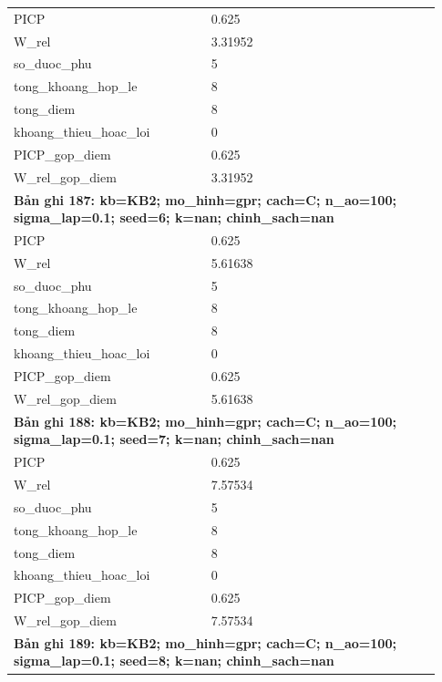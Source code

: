 \begin{longtable}{p{0.43\linewidth}p{0.50\linewidth}}
PICP & 0.625 \\
W\_\allowbreak rel & 3.31952 \\
so\_\allowbreak duoc\_\allowbreak phu & 5 \\
tong\_\allowbreak khoang\_\allowbreak hop\_\allowbreak le & 8 \\
tong\_\allowbreak diem & 8 \\
khoang\_\allowbreak thieu\_\allowbreak hoac\_\allowbreak loi & 0 \\
PICP\_\allowbreak gop\_\allowbreak diem & 0.625 \\
W\_\allowbreak rel\_\allowbreak gop\_\allowbreak diem & 3.31952 \\
\midrule
\multicolumn{2}{p{0.95\linewidth}}{\textbf{Bản ghi 187: kb=KB2; mo\_hinh=gpr; cach=C; n\_ao=100; sigma\_lap=0.1; seed=6; k=nan; chinh\_sach=nan}} \\
PICP & 0.625 \\
W\_\allowbreak rel & 5.61638 \\
so\_\allowbreak duoc\_\allowbreak phu & 5 \\
tong\_\allowbreak khoang\_\allowbreak hop\_\allowbreak le & 8 \\
tong\_\allowbreak diem & 8 \\
khoang\_\allowbreak thieu\_\allowbreak hoac\_\allowbreak loi & 0 \\
PICP\_\allowbreak gop\_\allowbreak diem & 0.625 \\
W\_\allowbreak rel\_\allowbreak gop\_\allowbreak diem & 5.61638 \\
\midrule
\multicolumn{2}{p{0.95\linewidth}}{\textbf{Bản ghi 188: kb=KB2; mo\_hinh=gpr; cach=C; n\_ao=100; sigma\_lap=0.1; seed=7; k=nan; chinh\_sach=nan}} \\
PICP & 0.625 \\
W\_\allowbreak rel & 7.57534 \\
so\_\allowbreak duoc\_\allowbreak phu & 5 \\
tong\_\allowbreak khoang\_\allowbreak hop\_\allowbreak le & 8 \\
tong\_\allowbreak diem & 8 \\
khoang\_\allowbreak thieu\_\allowbreak hoac\_\allowbreak loi & 0 \\
PICP\_\allowbreak gop\_\allowbreak diem & 0.625 \\
W\_\allowbreak rel\_\allowbreak gop\_\allowbreak diem & 7.57534 \\
\midrule
\multicolumn{2}{p{0.95\linewidth}}{\textbf{Bản ghi 189: kb=KB2; mo\_hinh=gpr; cach=C; n\_ao=100; sigma\_lap=0.1; seed=8; k=nan; chinh\_sach=nan}} \\

\end{longtable}
